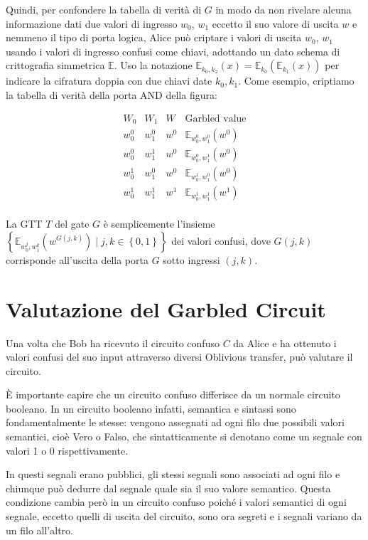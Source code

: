 \documentclass[
  italian,
]{book}
\begin{document}
Quindi, per confondere la tabella di verità di \(G\) in modo da non rivelare alcuna informazione dati due valori di ingresso \(w_0\), \(w_1\) eccetto il suo valore di uscita \(w\) e nemmeno il tipo di porta logica, Alice può criptare i valori di uscita \(w_0\), \(w_1\) usando i valori di ingresso confusi come chiavi, adottando un dato schema di crittografia simmetrica \(\mathbb{E}\). Uso la notazione \(\mathbb{E}_{k_0,k_2}(x) = \mathbb{E}_{k_0}(\mathbb{E}_{k_1}(x))\) per indicare la cifratura doppia con due chiavi date \(k_0, k_1\). Come esempio, criptiamo la tabella di verità della porta AND della figura:

\[\begin{array}{c|c|c||c}
W_0 & W_1 & W & \text{Garbled value} \\ \hline
        w_0^0 & w_1^0 & w^0 & \mathbb{E}_{w_0^0,w_1^0}(w^0) \\
        w_0^0 & w_1^1 & w^0 & \mathbb{E}_{w_0^0,w_1^1}(w^0) \\
        w_0^1 & w_1^0 & w^0 & \mathbb{E}_{w_0^1,w_1^0}(w^0)\\
        w_0^1 & w_1^1 & w^1 & \mathbb{E}_{w_0^1,w_1^1}(w^1) \\
\end{array}\]

La GTT \(T\) del gate \(G\) è semplicemente l'insieme \(\left\lbrace\mathbb{E}_{w_0^j,w_1^k}(w^{G(j,k)}) \mid j,k \in \left\lbrace0,1\right\rbrace \right\rbrace\) dei valori confusi, dove \(G(j,k)\) corrisponde all'uscita della porta \(G\) sotto ingressi \((j,k)\).

\newpage

\hypertarget{valutazione-del-garbled-circuit}{%
\section{Valutazione del Garbled Circuit}\label{valutazione-del-garbled-circuit}}

Una volta che Bob ha ricevuto il circuito confuso \(C\) da Alice e ha ottenuto i valori confusi del suo input attraverso diversi Oblivious transfer, può valutare il circuito.

È importante capire che un circuito confuso differisce da un normale circuito booleano. In un circuito booleano infatti, semantica e sintassi sono fondamentalmente le stesse: vengono assegnati ad ogni filo due possibili valori semantici, cioè Vero o Falso, che sintatticamente si denotano come un segnale con valori 1 o 0 rispettivamente.

In questi segnali erano pubblici, gli stessi segnali sono associati ad ogni filo e chiunque può dedurre dal segnale quale sia il suo valore semantico. Questa condizione cambia però in un circuito confuso poiché i valori semantici di ogni segnale, eccetto quelli di uscita del circuito, sono ora segreti e i segnali variano da un filo all'altro.
\end{document}
